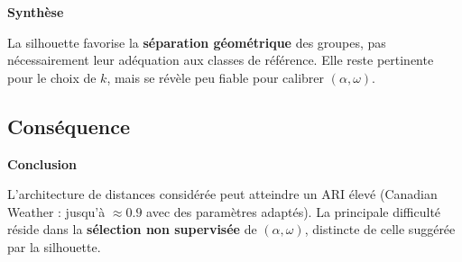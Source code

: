 \documentclass[11pt, a4paper]{article}
\newenvironment{keybox}[1][]{%
  \def\FrameCommand{\fboxsep=8pt \fcolorbox{emphborder}{emphbox}}%
  \MakeFramed{\advance\hsize-\width \FrameRestore}%
  \noindent\textbf{#1}\par\smallskip\noindent\ignorespaces
}{\endMakeFramed}
\newenvironment{resultbox}[1][]{%
  \def\FrameCommand{\fboxsep=8pt \fcolorbox{resultborder}{resultbox}}%
  \MakeFramed{\advance\hsize-\width \FrameRestore}%
  \noindent\textbf{#1}\par\smallskip\noindent\ignorespaces
}{\endMakeFramed}
\begin{document}
\begin{keybox}[Synthèse]
La silhouette favorise la \textbf{séparation géométrique} des groupes, pas
nécessairement leur adéquation aux classes de référence. Elle reste pertinente
pour le choix de $k$, mais se révèle peu fiable pour calibrer
$(\alpha, \omega)$.
\end{keybox}

\subsection{Conséquence}

\begin{resultbox}[Conclusion]
L'architecture de distances considérée peut atteindre un ARI élevé
(Canadian Weather : jusqu'à $\approx 0.9$ avec des paramètres adaptés). La
principale difficulté réside dans la \textbf{sélection non supervisée} de
$(\alpha, \omega)$, distincte de celle suggérée par la silhouette.
\end{resultbox}
\end{document}
